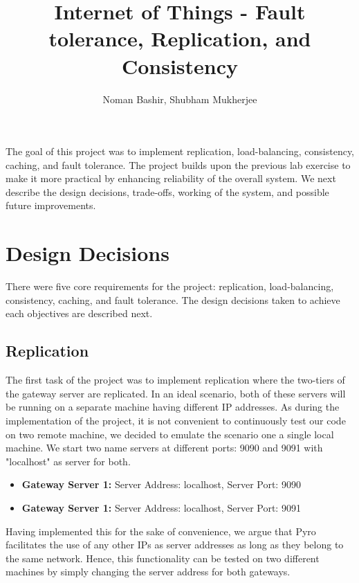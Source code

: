 \documentclass[12pt]{article}
\begin{document}
 
\title{Internet of Things - Fault tolerance, Replication, and Consistency}%
\author{Noman Bashir, Shubham Mukherjee}
\maketitle


The goal of this project was to implement replication, load-balancing, consistency, caching, and fault tolerance.
The project builds upon the previous lab exercise
to make it more practical by enhancing reliability
of the overall system. 
We next describe the design decisions, trade-offs, 
working of the system, and possible future 
improvements. 

\section{Design Decisions}
There were five core requirements for the project:
replication, load-balancing, consistency, caching, and 
fault tolerance. The design decisions taken to
achieve each objectives are described next. 
\subsection{Replication}
The first task of the project was to implement replication 
where the two-tiers of the gateway server are replicated. 
In an ideal scenario, both of these servers will be running
on a separate machine having different IP addresses. 
As during the implementation of the project, it is not 
convenient to continuously test our code on two remote 
machine, we decided to emulate the scenario one a single local machine. 
We start two name servers at different ports: 9090 and 9091 with "localhost" as server for both. 
\begin{itemize}
	\item \textbf{Gateway Server 1: } Server Address: localhost, Server Port: 9090
	\item \textbf{Gateway Server 1: } Server Address: localhost, Server Port: 9091
\end{itemize}

Having implemented this for the sake of convenience, we 
argue that Pyro facilitates the use of any other IPs as server 
addresses as long as they belong to the same network. 
Hence, this functionality can be tested on two different 
machines by simply changing the server address for both 
gateways. 
\end{document}
